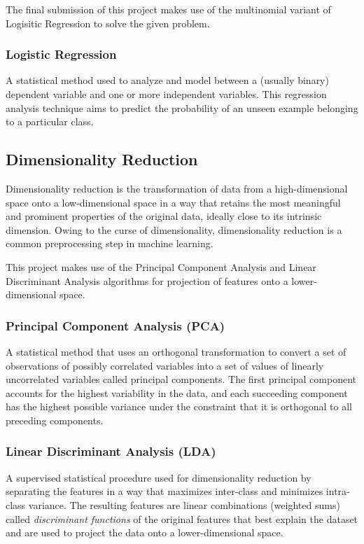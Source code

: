 \documentclass[conference]{IEEEtran}
\begin{document}
    The final submission of this project makes use of the multinomial variant of Logisitic Regression to solve the given problem.
    \vspace*{3.0pt}

    \subsubsection{Logistic Regression}
    \label{sec:lr}
    A statistical method used to analyze and model between a (usually binary) dependent variable and one or more independent variables.
    This regression analysis technique aims to predict the probability of an unseen example belonging to a particular class.

    \subsection{Dimensionality Reduction}
    \label{sec:dimred}
    Dimensionality reduction is the transformation of data from a high-dimensional space onto a low-dimensional space in a way that
    retains the most meaningful and prominent properties of the original data, ideally close to its intrinsic dimension.
    Owing to the curse of dimensionality, dimensionality reduction is a common preprocessing step in machine learning.

    This project makes use of the Principal Component Analysis and Linear Discriminant Analysis algorithms for
    projection of features onto a lower-dimensional space.
    \vspace*{3.0pt}

    \subsubsection{Principal Component Analysis (PCA)}
    \label{sec:pca}
    A statistical method that uses an orthogonal transformation to convert a set of observations of possibly correlated variables
    into a set of values of linearly uncorrelated variables called principal components.
    The first principal component accounts for the highest variability in the data, and each succeeding component has the
    highest possible variance under the constraint that it is orthogonal to all preceding components.
    \vspace*{3.0pt}

    \subsubsection{Linear Discriminant Analysis (LDA)}
    \label{sec:lda}
    A supervised statistical procedure used for dimensionality reduction by separating the features in a way that maximizes
    inter-class and minimizes intra-class variance.
    The resulting features are linear combinations (weighted sums) called \textit{discriminant functions} of the original
    features that best explain the dataset and are used to project the data onto a lower-dimensional space.
\end{document}

